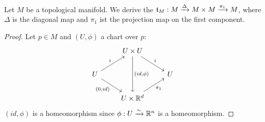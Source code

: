  \\
Let $M$ be a topological manifold.
We derive the  $\mathfrak{t}_M: M \xrightarrow{\Delta} M \times M \xrightarrow{\pi_1} M{}$, where
$\Delta$ is the diagonal map and $\pi_1$ ist the projection map on the first component.
\begin{proof}
Let $p \in M$ and $(U, \phi)$ a chart over $p$:
\[\begin{tikzcd}
    & U \times U \ar[dr, "i"] \ar[dd, "{(id, \phi)}"] & \\
    U \ar[ur, "i"] \ar[dr, "{(0, id)}"'] & & U \\
    & U \times \R^d \ar[ur, "\pi_1"'] &
\end{tikzcd}\]
$(id, \phi)$ is a homeomorphism since $\phi: U \xrightarrow{\sim} \mathbb{R}^n$ is a homeomorphism.
\end{proof}